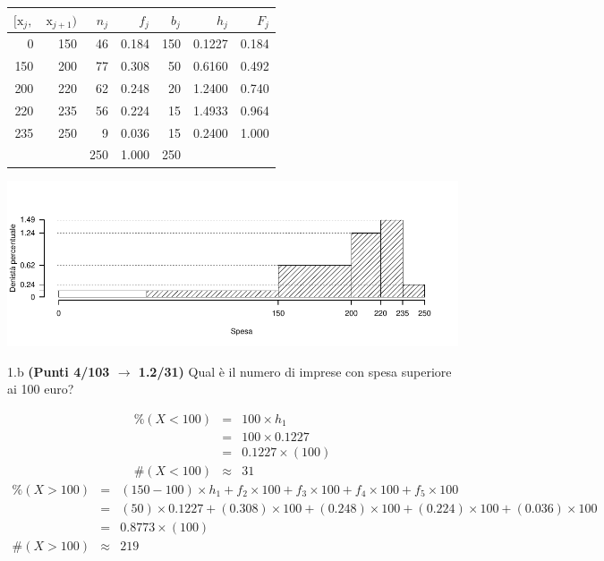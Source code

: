 \documentclass[
  11pt,
]{book}
\theoremstyle{mytheoremstyle}
\theoremstyle{mydefstyle}
\newenvironment{sol}
  {
  \begin{tcolorbox}[enhanced,breakable,arc=0.1mm,boxrule=1pt,colback=white,colframe=iblue,
  title=\bf \fontfamily{lmss}\selectfont \hspace{.5 cm} Soluzione,drop fuzzy shadow]

}{
\end{tcolorbox}
  }
\begin{document}
\begin{sol}

\begin{table}[H]
\centering
\begin{tabular}{rrrrrrr}
\toprule
$[\text{x}_j,$ & $\text{x}_{j+1})$ & $n_j$ & $f_j$ & $b_j$ & $h_j$ & $F_j$\\
\midrule
0 & 150 & 46 & 0.184 & 150 & 0.1227 & 0.184\\
150 & 200 & 77 & 0.308 & 50 & 0.6160 & 0.492\\
200 & 220 & 62 & 0.248 & 20 & 1.2400 & 0.740\\
220 & 235 & 56 & 0.224 & 15 & 1.4933 & 0.964\\
235 & 250 & 9 & 0.036 & 15 & 0.2400 & 1.000\\
 &  & 250 & 1.000 & 250 &  & \\
\bottomrule
\end{tabular}
\end{table}

\begin{center}\includegraphics{Esami_passati_con_soluzioni_files/figure-latex/2023-193-1} \end{center}

\end{sol}

1.b \textbf{(Punti 4/103 \(\rightarrow\) 1.2/31)} Qual è il numero di imprese con spesa superiore ai 100 euro?

\begin{sol}
\begin{eqnarray*}
     \%(X< 100 ) &=& 100 \times h_1 \\
              &=& 100 \times  0.1227 \\
              &=&  0.1227 \times(100) \\
     \#(X< 100 ) &\approx& 31 
         \end{eqnarray*}\begin{eqnarray*}
     \%(X> 100 ) &=& ( 150 - 100 )\times h_{ 1 }+ f_{ 2 }\times 100+f_{ 3 }\times 100+f_{ 4 }\times 100+f_{ 5 }\times 100 \\
              &=& ( 50 )\times 0.1227 + ( 0.308 )\times 100+( 0.248 )\times 100+( 0.224 )\times 100+( 0.036 )\times 100 \\
              &=&  0.8773 \times(100)\\
     \#(X> 100 ) &\approx& 219 
         \end{eqnarray*}

\end{sol}
\end{document}
